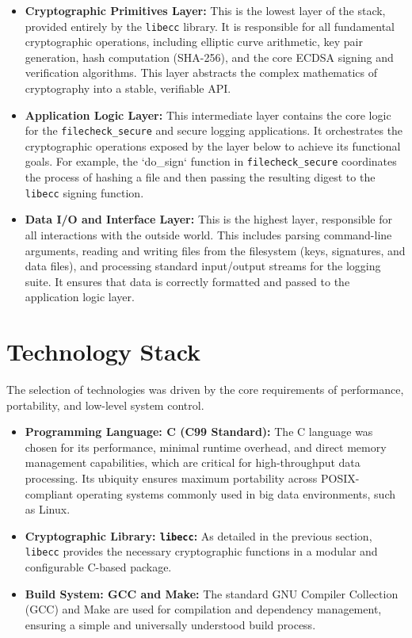 \begin{itemize}
	\item \textbf{Cryptographic Primitives Layer:} This is the lowest layer of the stack, provided entirely by the \texttt{libecc} library. It is responsible for all fundamental cryptographic operations, including elliptic curve arithmetic, key pair generation, hash computation (SHA-256), and the core ECDSA signing and verification algorithms. This layer abstracts the complex mathematics of cryptography into a stable, verifiable API.
	
	\item \textbf{Application Logic Layer:} This intermediate layer contains the core logic for the \texttt{filecheck\_secure} and secure logging applications. It orchestrates the cryptographic operations exposed by the layer below to achieve its functional goals. For example, the `do\_sign` function in \texttt{filecheck\_secure} coordinates the process of hashing a file and then passing the resulting digest to the \texttt{libecc} signing function.
	
	\item \textbf{Data I/O and Interface Layer:} This is the highest layer, responsible for all interactions with the outside world. This includes parsing command-line arguments, reading and writing files from the filesystem (keys, signatures, and data files), and processing standard input/output streams for the logging suite. It ensures that data is correctly formatted and passed to the application logic layer.
\end{itemize}

\section{Technology Stack}
The selection of technologies was driven by the core requirements of performance, portability, and low-level system control.
\begin{itemize}
	\item \textbf{Programming Language: C (C99 Standard):} The C language was chosen for its performance, minimal runtime overhead, and direct memory management capabilities, which are critical for high-throughput data processing. Its ubiquity ensures maximum portability across POSIX-compliant operating systems commonly used in big data environments, such as Linux.
	\item \textbf{Cryptographic Library: \texttt{libecc}:} As detailed in the previous section, \texttt{libecc} provides the necessary cryptographic functions in a modular and configurable C-based package.
	\item \textbf{Build System: GCC and Make:} The standard GNU Compiler Collection (GCC) and Make are used for compilation and dependency management, ensuring a simple and universally understood build process.
\end{itemize}

